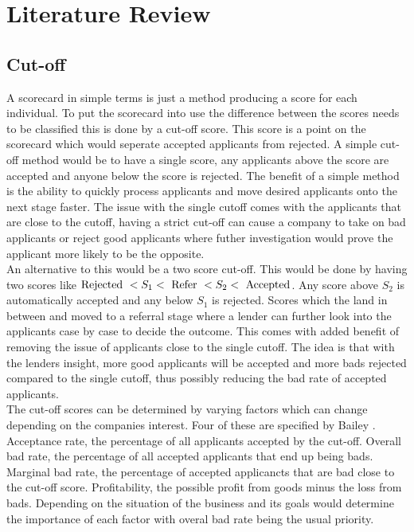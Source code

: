 \chapter{Literature Review}

\section{Cut-off}

A scorecard in simple terms is just a method producing a score for each individual. To put the scorecard into use the difference between the scores needs to be classified this is done by a cut-off score. This score is a point on the scorecard which would seperate accepted applicants from rejected. A simple cut-off method would be to have a single score, any applicants above the score are accepted and anyone below the score is rejected. The benefit of a simple method is the ability to quickly process applicants and move desired applicants onto the next stage faster. The issue with the single cutoff comes with the applicants that are close to the cutoff, having a strict cut-off can cause a company to take on bad applicants or reject good applicants where futher investigation would prove the applicant more likely to be the opposite. \\

An alternative to this would be a two score cut-off. This would be done by having two scores like $ \textup{Rejected } < S_{1} < \textup{ Refer } < S_{2} < \textup{ Accepted}$. Any score above $S_{2}$ is automatically accepted and any below $S_{1}$ is rejected. Scores which the land in between and moved to a referral stage where a lender can further look into the applicants case by case to decide the outcome. This comes with added benefit of removing the issue of applicants close to the single cutoff. The idea is that with the lenders insight, more good applicants will be accepted and more bads rejected compared to the single cutoff, thus possibly reducing the bad rate of accepted applicants. \\

The cut-off scores can be determined by varying factors which can change depending on the companies interest. Four of these are specified by Bailey \cite{bailey2004credit}. Acceptance rate, the percentage of all applicants accepted by the cut-off. Overall bad rate, the percentage of all accepted applicants that end up being bads. Marginal bad rate, the percentage of accepted applicancts that are bad close to the cut-off score. Profitability, the possible profit from goods minus the loss from bads. Depending on the situation of the business and its goals would determine the importance of each factor with overal bad rate being the usual priority.

